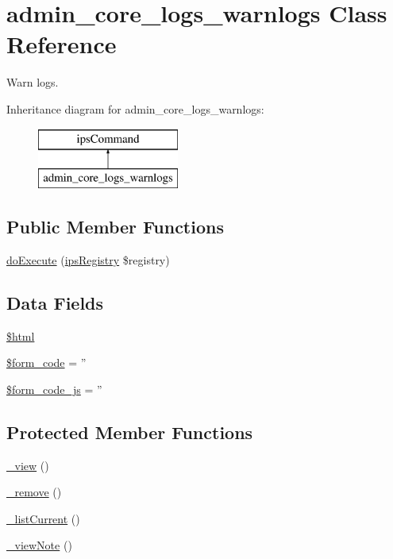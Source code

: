 \hypertarget{classadmin__core__logs__warnlogs}{\section{admin\-\_\-core\-\_\-logs\-\_\-warnlogs Class Reference}
\label{classadmin__core__logs__warnlogs}
}


Warn logs.  


Inheritance diagram for admin\-\_\-core\-\_\-logs\-\_\-warnlogs\-:\begin{figure}[H]
\begin{center}
\leavevmode
\includegraphics[height=2.000000cm]{classadmin__core__logs__warnlogs}
\end{center}
\end{figure}
\subsection*{Public Member Functions}
\begin{DoxyCompactItemize}
\item 
\hyperlink{classadmin__core__logs__warnlogs_afbc4e912a0604b94d47d66744c64d8ba}{do\-Execute} (\hyperlink{classips_registry}{ips\-Registry} \$registry)
\end{DoxyCompactItemize}
\subsection*{Data Fields}
\begin{DoxyCompactItemize}
\item 
\hyperlink{classadmin__core__logs__warnlogs_a6f96e7fc92441776c9d1cd3386663b40}{\$html}
\item 
\hyperlink{classadmin__core__logs__warnlogs_af28aee726fa3eb6c355d08a2ab655e03}{\$form\-\_\-code} = ''
\item 
\hyperlink{classadmin__core__logs__warnlogs_ac68fe8a02a2efd63c3271179f4b4fbb7}{\$form\-\_\-code\-\_\-js} = ''
\end{DoxyCompactItemize}
\subsection*{Protected Member Functions}
\begin{DoxyCompactItemize}
\item 
\hyperlink{classadmin__core__logs__warnlogs_aecb3513e402840411fb3737f4f2d3193}{\-\_\-view} ()
\item 
\hyperlink{classadmin__core__logs__warnlogs_a6e3a0c448dcfd8610c6ddf42c6c660aa}{\-\_\-remove} ()
\item 
\hyperlink{classadmin__core__logs__warnlogs_abc03e9ca0857dea04554a012ac374f5a}{\-\_\-list\-Current} ()
\item 
\hyperlink{classadmin__core__logs__warnlogs_ab6d88ecaa67b4443d930bf840898e75e}{\-\_\-view\-Note} ()
\end{DoxyCompactItemize}
